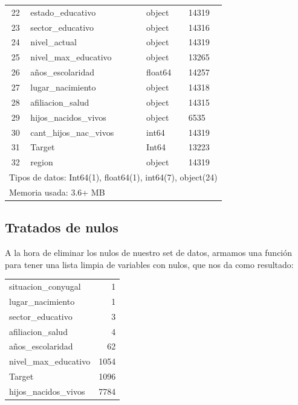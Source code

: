\documentclass[a4paper]{article}
\begin{document}
\begin{table}[H]
\begin{tabular}{clll}
            22  & estado\_educativo & object & 14319 \\ 
            23  & sector\_educativo & object & 14316 \\ 
            24  & nivel\_actual & object & 14319 \\ 
            25  & nivel\_max\_educativo & object & 13265 \\ 
            26  & años\_escolaridad & float64 & 14257 \\ 
            27  & lugar\_nacimiento & object & 14318 \\ 
            28  & afiliacion\_salud & object & 14315 \\ 
            29  & hijos\_nacidos\_vivos & object & 6535 \\ 
            30  & cant\_hijos\_nac\_vivos & int64 & 14319 \\ 
            31  & Target & Int64 & 13223 \\ 
            32  & region & object & 14319 \\
            \multicolumn{4}{l}{Tipos de datos: Int64(1), float64(1), int64(7), object(24)} \\
            \multicolumn{4}{l}{Memoria usada: 3.6+ MB } \\
        \end{tabular}
    \end{table}

    \subsection{Tratados de nulos}

        A la hora de eliminar los nulos de nuestro set de datos, armamos una función para tener una lista limpia de variables con nulos, que nos da como resultado:

        \begin{table}[H]
            \begin{tabular}{lr}
                situacion\_conyugal & 1 \\ 
                lugar\_nacimiento & 1 \\ 
                sector\_educativo & 3 \\ 
                afiliacion\_salud & 4 \\ 
                años\_escolaridad & 62 \\ 
                nivel\_max\_educativo & 1054 \\ 
                Target & 1096 \\ 
                hijos\_nacidos\_vivos & 7784 \\ 
            \end{tabular}
        \end{table}
\end{document}
